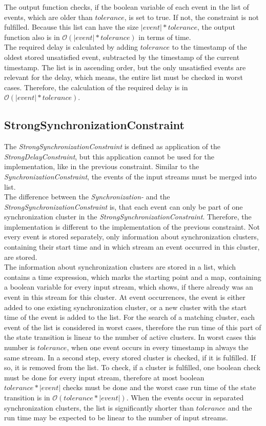 	The output function checks, if the boolean variable of each event in the list of events, which are older than $tolerance$, is set to true. If not, the constraint is not fulfilled. Because this list can have the size $|event|*tolerance$, the output function also is in $\mathcal{O}(|event|*tolerance)$ in terms of time.\\
	The required delay is calculated by adding $tolerance$ to the timestamp of the oldest stored unsatisfied event, subtracted by the timestamp of the current timestamp. The list is in ascending order, but the only unsatisfied events are relevant for the delay, which means, the entire list must be checked in worst cases. Therefore, the calculation of the required delay is in $\mathcal{O}(|event|*tolerance)$.
	
\subsection{StrongSynchronizationConstraint}
	The \emph{StrongSynchronizationConstraint} is defined as application of the \emph{StrongDelayConstraint}, but this application cannot be used for the implementation, like in the previous constraint. Similar to the \emph{SynchronizationConstraint}, the events of the input streams must be merged into list.\\
	The difference between the \emph{Synchronization-} and the \emph{StrongSynchronizationConstraint} is, that each event can only be part of one synchronization cluster in the \emph{StrongSynchronizationConstraint}. Therefore, the implementation is different to the implementation of the previous constraint. Not every event is stored separately, only information about synchronization clusters, containing their start time and in which stream an event occurred in this cluster, are stored.\\
	The information about synchronization clusters are stored in a list, which contains a time expression, which marks the starting point and a map, containing a boolean variable for every input stream, which shows, if there already was an event in this stream for this cluster. At event occurrences, the event is either added to one existing synchronization cluster, or a new cluster with the start time of the event is added to the list. For the search of a matching cluster, each event of the list is considered in worst cases, therefore the run time of this part of the state transition is linear to the number of active clusters. In worst cases this number is $tolerance$, when one event occurs in every timestamp in always the same stream. In a second step, every stored cluster is checked, if it is fulfilled. If so, it is removed from the list. To check, if a cluster is fulfilled, one boolean check must be done for every input stream, therefore at most boolean $tolerance*|event|$ checks must be done and the worst case run time of the state transition is in $\mathcal{O}(tolerance * |event|)$. When the events occur in separated synchronization clusters, the list is significantly shorter than $tolerance$ and the run time may be expected to be linear to the number of input streams.\\
